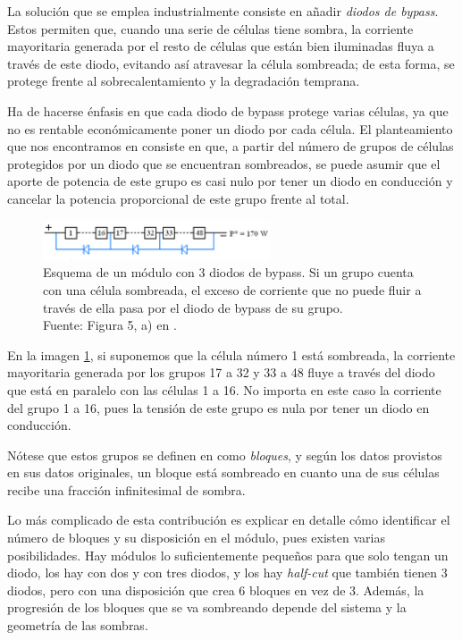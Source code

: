 La solución que se emplea industrialmente consiste en añadir \textit{diodos de bypass}. Estos permiten que, cuando una serie de células tiene sombra, la corriente mayoritaria generada por el resto de células que están bien iluminadas fluya a través de este diodo, evitando así atravesar la célula sombreada; de esta forma, se protege frente al sobrecalentamiento y la degradación temprana.

Ha de hacerse énfasis en que cada diodo de bypass protege varias células, ya que no es rentable económicamente poner un diodo por cada célula. El planteamiento que nos encontramos en \cite{Martínez-Moreno_Muñoz_Lorenzo_2010} consiste en que, a partir del número de grupos de células protegidos por un diodo que se encuentran sombreados, se puede asumir que el aporte de potencia de este grupo es casi nulo por tener un diodo en conducción y cancelar la potencia proporcional de este grupo frente al total.

\begin{figure}[H]
    \centering
    \includegraphics[width=0.6\textwidth]{./images/bypass_diodes/bypass_diodes.png}
    \caption{Esquema de un módulo con 3 diodos de bypass. Si un grupo cuenta con una célula sombreada, el exceso de corriente que no puede fluir a través de ella pasa por el diodo de bypass de su grupo.\\Fuente: Figura 5, a) en \cite{Martínez-Moreno_Muñoz_Lorenzo_2010}.}
    \label{fig:diodos_bypass}
\end{figure}

En la imagen \ref{fig:diodos_bypass}, si suponemos que la célula número 1 está sombreada, la corriente mayoritaria generada por los grupos 17 a 32 y 33 a 48 fluye a través del diodo que está en paralelo con las células 1 a 16. No importa en este caso la corriente del grupo 1 a 16, pues la tensión de este grupo es nula por tener un diodo en conducción.

Nótese que estos grupos se definen en \cite{Martínez-Moreno_Muñoz_Lorenzo_2010} como \textit{bloques}, y según los datos provistos en sus datos originales, un bloque está sombreado en cuanto una de sus células recibe una fracción infinitesimal de sombra.

Lo más complicado de esta contribución es explicar en detalle cómo identificar el número de bloques y su disposición en el módulo, pues existen varias posibilidades. Hay módulos lo suficientemente pequeños para que solo tengan un diodo, los hay con dos y con tres diodos, y los hay \textit{half-cut} que también tienen 3 diodos, pero con una disposición que crea 6 bloques en vez de 3. Además, la progresión de los bloques que se va sombreando depende del sistema y la geometría de las sombras.


